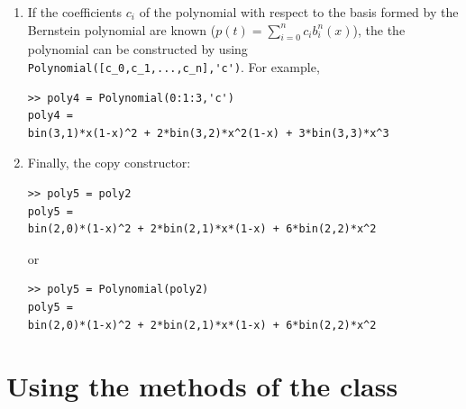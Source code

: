 \documentclass[a4paper,10pt]{report}
\begin{document}
\begin{enumerate}
  \item If the coefficients $c_i$ of the polynomial with respect to the basis formed by the Bernstein polynomial are known
  ($p(t)=\sum_{i=0}^n c_i b_i^n(x)$), the the polynomial can be constructed by using \verb"Polynomial([c_0,c_1,...,c_n],'c')".
  For example,
\begin{verbatim}
>> poly4 = Polynomial(0:1:3,'c')
poly4 = 
bin(3,1)*x(1-x)^2 + 2*bin(3,2)*x^2(1-x) + 3*bin(3,3)*x^3
\end{verbatim}
  \item Finally, the copy constructor:
\begin{verbatim}
>> poly5 = poly2
poly5 = 
bin(2,0)*(1-x)^2 + 2*bin(2,1)*x*(1-x) + 6*bin(2,2)*x^2
\end{verbatim}
  or
\begin{verbatim}
>> poly5 = Polynomial(poly2)
poly5 = 
bin(2,0)*(1-x)^2 + 2*bin(2,1)*x*(1-x) + 6*bin(2,2)*x^2
  \end{verbatim}
\end{enumerate}

\section{Using the methods of the class}
\end{document}
